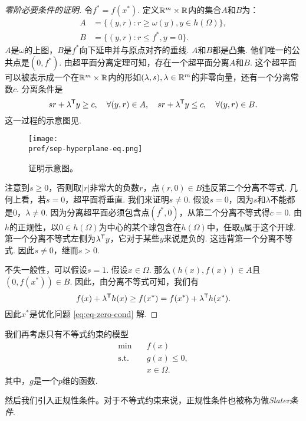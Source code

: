 \begin{proof}[零阶必要条件的证明]
令$f^\ast=f({x^\ast})$. 定义$\mathbb{R}^m\times\mathbb{R}$内的集合$A$和$B$为：
\begin{align*}
    A&=\{(y,r):r\ge \omega({y}),{y}\in h(\Omega)\},\\ 
    B&=\{(y,r):r\le f^\ast,y=0\}.
\end{align*}
$A$是$\omega$的上图，$B$是$f^\ast$向下延申并与原点对齐的垂线. $A$和$B$都是凸集. 他们唯一的公共点是$(0,f^\ast)$. 由超平面分离定理可知，存在一个超平面分离$A$和$B$. 这个超平面可以被表示成一个在$\mathbb{R}^m\times\mathbb{R}$内的形如$(\lambda,s),\lambda\in \mathbb{R}^{m}$的非零向量，还有一个分离常数$c$. 分离条件是$$sr+{\lambda^{\mathsf{T}} y}\ge c,\quad\forall(y,r)\in A,\quad sr+{\lambda^{\mathsf{T}} y}\le c,\quad\forall(y,r)\in B.$$ 
这一过程的示意图见.

\begin{figure}[ht]
    \centering
    \texttt{[image: \\pref/sep-hyperplane-eq.png]}
    \caption{证明示意图。}
    \label{fig:sep-hyperplane-eq}
\end{figure}

注意到$s\ge 0$，否则取$|r|$非常大的负数$r$，点$(r,{0})\in B$违反第二个分离不等式. 几何上看，若$s=0$，超平面将垂直. 我们来证明$s\neq 0$. 假设$s=0$，因为$s$和${\lambda}$不能都是$0$，${\lambda\neq 0}$. 因为分离超平面必须包含点$(f^\ast,{0})$，从第二个分离不等式得$c=0$. 由$h$的正规性，以${0\in h(\Omega)}$为中心的某个球包含在$h(\Omega)$中，任取$y$属于这个开球. 第一个分离不等式左侧为${\lambda^{\mathsf{T}} y}$，它对于某些${y}$来说是负的. 这违背第一个分离不等式. 因此$s\neq 0$，继而$s>0$. 

不失一般性，可以假设$s=1$. 假设$x\in\Omega$. 那么$(h(x),f(x))\in A$且$(0,f(x^\ast))\in B$. 因此，由分离不等式可知，我们有$$f({x})+{\lambda^{\mathsf{T}} h(x)}\ge f({x^\ast})=f({x^\ast})+{\lambda^{\mathsf{T}} h(x^\ast)}.$$ 因此${x^\ast}$是优化问题 \eqref{eq:eq-zero-cond} 解. 
\end{proof}

我们再考虑只有不等式约束的模型
\begin{equation}
    \begin{aligned}
    \min\quad & f({x})\\
    \text{s.t.}\quad& {g(x)\le 0},\\
    &{x}\in\Omega.
\end{aligned}\label{eq:ineq-zero-cond}
\end{equation}
其中，${g}$是一个$p$维的函数. 


然后我们引入正规性条件。对于不等式约束来说，正规性条件也被称为做\emph{Slater条件}. 

